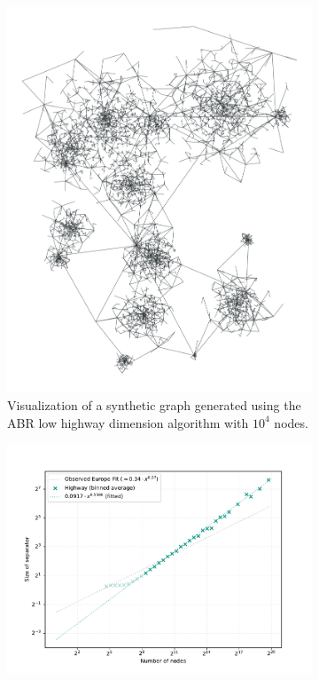 \begin{figure}[tbhp]
	\centering
	\begin{subfigure}{0.35\linewidth}
		\centering
		\includegraphics[height=\linewidth, angle=90]{graphics/highway.png}
		\caption{Visualization of a synthetic graph generated using the ABR low highway dimension algorithm with \(10^4\) nodes.}
		\label{fig:abr_graph_viz}
	\end{subfigure}
	\hfill
	\begin{subfigure}{0.55\linewidth}
		\centering
		\includegraphics[width=\linewidth]{graphics/sep_highway.pdf}

\end{subfigure}
\end{figure}
